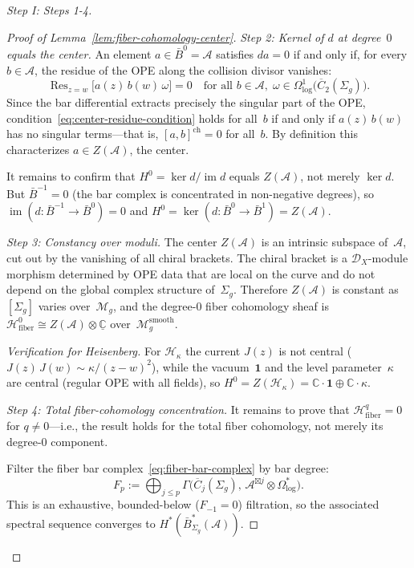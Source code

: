 \begin{proof}[Step I: Steps 1-4]
\begin{proof}[Proof of Lemma~\ref{lem:fiber-cohomology-center}]
\emph{Step 2: Kernel of $d$ at degree~$0$ equals the center.}
An element $a \in \bar{B}^0 = \mathcal{A}$ satisfies $da = 0$ if
and only if, for every $b \in \mathcal{A}$, the residue of the OPE
along the collision divisor vanishes:
\begin{equation}\label{eq:center-residue-condition}
\operatorname{Res}_{z=w}\bigl[a(z)\,b(w)\,\omega\bigr] = 0
\quad\text{for all }
b \in \mathcal{A},\;
\omega \in \Omega^1_{\log}\bigl(\overline{C}_2(\Sigma_g)\bigr).
\end{equation}
Since the bar differential extracts precisely the singular part of
the OPE, condition~\eqref{eq:center-residue-condition} holds for
all~$b$ if and only if $a(z)\,b(w)$ has no singular terms---that is,
$[a,b]^{\mathrm{ch}} = 0$ for all~$b$.  By definition this
characterizes $a \in Z(\mathcal{A})$, the center.

It remains to confirm that $H^0 = \ker d / \operatorname{im} d$
equals $Z(\mathcal{A})$, not merely $\ker d$.  But $\bar{B}^{-1} = 0$
(the bar complex is concentrated in non-negative degrees), so
$\operatorname{im}(d\colon \bar{B}^{-1} \to \bar{B}^0) = 0$ and
$H^0 = \ker(d\colon \bar{B}^0 \to \bar{B}^1) = Z(\mathcal{A})$.

\emph{Step 3: Constancy over moduli.}
The center $Z(\mathcal{A})$ is an intrinsic subspace of~$\mathcal{A}$,
cut out by the vanishing of all chiral brackets.  The chiral bracket is
a $\mathcal{D}_X$-module morphism determined by OPE data that are local
on the curve and do not depend on the global complex structure
of~$\Sigma_g$.  Therefore $Z(\mathcal{A})$ is constant as
$[\Sigma_g]$ varies over~$\mathcal{M}_g$, and the degree-$0$ fiber
cohomology sheaf is
$\mathcal{H}^0_{\mathrm{fiber}} \cong
 Z(\mathcal{A}) \otimes \underline{\mathbb{C}}$
over~$\mathcal{M}_g^{\mathrm{smooth}}$.

\emph{Verification for Heisenberg.}
For $\mathcal{H}_\kappa$ the current $J(z)$ is not central
($J(z)\,J(w) \sim \kappa/(z-w)^2$), while the vacuum~$\mathbf{1}$
and the level parameter~$\kappa$ are central (regular OPE with all
fields), so $H^0 = Z(\mathcal{H}_\kappa) =
\mathbb{C}\cdot\mathbf{1} \oplus \mathbb{C}\cdot\kappa$.

\emph{Step 4: Total fiber-cohomology concentration.}
It remains to prove that $\mathcal{H}^q_{\mathrm{fiber}} = 0$ for
$q \neq 0$---i.e., the result holds for the total fiber cohomology,
not merely its degree-$0$ component.

Filter the fiber bar complex~\eqref{eq:fiber-bar-complex} by bar
degree:
\[
F_p := \bigoplus_{j \leq p}
\Gamma\bigl(\overline{C}_j(\Sigma_g),\,
\mathcal{A}^{\boxtimes j} \otimes \Omega^*_{\log}\bigr).
\]
This is an exhaustive, bounded-below ($F_{-1}=0$) filtration, so the
associated spectral sequence converges to
$H^*(\bar{B}^*_{\Sigma_g}(\mathcal{A}))$.


\end{proof}
\end{proof}
